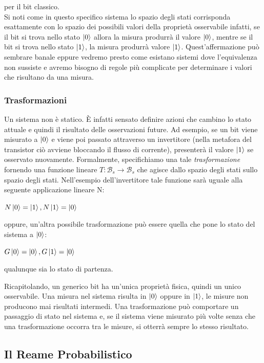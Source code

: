\documentclass[12pt,a4paper,openright]{report}
\begin{document}
per il bit classico.\\
Si noti come in questo specifico sistema lo spazio degli stati corrisponda esattamente con lo spazio dei possibili valori della proprietà
osservabile infatti, se il bit si trova nello stato $\ket0$ allora la misura produrrà il valore $\ket0$, mentre se il bit si trova nello stato $\ket1$,
la misura produrrà valore $\ket1$. Quest'affermazione può sembrare banale eppure vedremo presto come esistano sistemi dove l'equivalenza 
non sussiste e avremo bisogno di regole più complicate per determinare i valori che risultano da una misura. 

\subsubsection{Trasformazioni}
Un sistema non è statico. È infatti sensato definire azioni che cambino lo stato attuale e quindi il risultato delle osservazioni future. Ad esempio,
se un bit viene misurato a $\ket0$ e viene poi passato attraverso un invertitore (nella metafora del transistor ciò avviene bloccando il flusso di corrente), presenterà il valore $\ket1$ se osservato nuovamente. 
Formalmente, specifichiamo una tale \emph{trasformazione} fornendo una funzione lineare $T:\mathcal{B}_s \rightarrow \mathcal{B}_s$ che agisce dallo spazio degli stati sullo spazio degli stati. 
Nell'esempio dell'invertitore tale funzione sarà uguale alla seguente applicazione lineare N:
\begin{center}
    $ N\ket0 = \ket1, N\ket1 = \ket0 $
\end{center}
oppure, un'altra possibile trasformazione può essere quella che pone lo stato del sistema a $\ket0$:
\begin{center}
    $G\ket0 = \ket0,  G\ket1 = \ket0$
\end{center}
qualunque sia lo stato di partenza.
\par
Ricapitolando, un generico bit ha un'unica proprietà fisica, quindi un unico osservabile. Una misura nel sistema risulta in $\ket0$ oppure in $\ket1$, le 
misure non producono mai risultati intermedi. Una trasformazione può comportare un passaggio di stato nel sistema e, se il sistema viene misurato più volte 
 senza che una trasformazione occorra tra le misure, si otterrà sempre lo stesso risultato.

\subsection{Il Reame Probabilistico}
\end{document}
